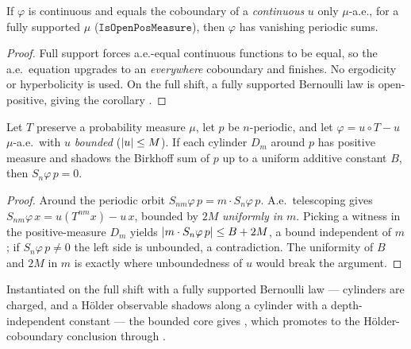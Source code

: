 \begin{theorem}\label{thm:livsic-continuous-tier}
  \leanok
  If \(\varphi\) is continuous and equals the coboundary of a \emph{continuous} \(u\) only
  \(\mu\)-a.e., for a fully supported \(\mu\) (\(\texttt{IsOpenPosMeasure}\)), then \(\varphi\) has
  vanishing periodic sums.
\end{theorem}
\begin{proof}\leanok
  Full support forces a.e.-equal continuous functions to be equal, so the a.e.\ equation upgrades to
  an \emph{everywhere} coboundary and  finishes. No ergodicity or
  hyperbolicity is used. On the full shift, a fully supported Bernoulli law is open-positive, giving
  the corollary .
\end{proof}

\begin{theorem}\label{thm:livsic-bounded-tier}
  \leanok
  Let \(T\) preserve a probability measure \(\mu\), let \(p\) be \(n\)-periodic, and let
  \(\varphi = u\circ T - u\) \(\mu\)-a.e.\ with \(u\) \emph{bounded} (\(\left\lvert u \right\rvert\le M\)). If each
  cylinder \(D_m\) around \(p\) has positive measure and shadows the Birkhoff sum of \(p\) up to a
  uniform additive constant \(B\), then \(S_n\varphi\,p = 0\).
\end{theorem}
\begin{proof}\leanok
  Around the periodic orbit \(S_{nm}\varphi\,p = m\cdot S_n\varphi\,p\). A.e.\ telescoping gives
  \(S_{nm}\varphi\,x = u(T^{nm}x) - u\,x\), bounded by \(2M\) \emph{uniformly in \(m\)}. Picking a
  witness in the positive-measure \(D_m\) yields \(\left\lvert m\cdot S_n\varphi\,p \right\rvert\le B + 2M\), a bound
  independent of \(m\); if \(S_n\varphi\,p\ne 0\) the left side is unbounded, a contradiction. The
  uniformity of \(B\) and \(2M\) in \(m\) is exactly where unboundedness of \(u\) would break the
  argument.
\end{proof}

Instantiated on the full shift with a fully supported Bernoulli law --- cylinders are charged, and a
Hölder observable shadows along a cylinder with a depth-independent constant --- the bounded core
gives , which promotes to
the Hölder-coboundary conclusion 
through .

